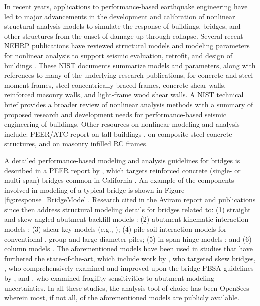 In recent years, applications to performance-based earthquake engineering have led to major advancements in the development and calibration of nonlinear structural analysis models to simulate the response of buildings, bridges, and other structures from the onset of damage up through collapse. Several recent NEHRP publications have reviewed structural models and modeling parameters for nonlinear analysis to support seismic evaluation, retrofit, and design of buildings \citep{nist2017guidelines, nist2017guidelinesa, nist2017guidelinesb}. These NIST documents summarize models and parameters, along with references to many of the underlying research publications, for concrete and steel moment frames, steel concentrically braced frames, concrete shear walls, reinforced masonry walls, and light-frame wood shear walls. A NIST technical brief \citep{deierlein2010nonlinear} provides a broader review of nonlinear analysis methods with a summary of proposed research and development needs for performance-based seismic engineering of buildings. Other resources on nonlinear modeling and analysis include: PEER/ATC report on tall buildings \citep{malley2010modeling}, \citet{spacone2004nonlinear} on composite steel-concrete structures, and \citet{nurbaiah2017modelling} on masonry infilled RC frames.

A detailed performance-based modeling and analysis guidelines for bridges is described in a PEER report by \citet{aviram2008guidelines}, which targets reinforced concrete (single- or multi-span) bridges common in California \citep{nbi2016national}. An example of the components involved in modeling of a typical bridge is shown in Figure \ref{fig:response_BridgeModel}. Research cited in the Aviram report and publications since then address structural modeling details for bridges related to: (1) straight and skew angled abutment backfill models \citep{shamsabadi2010validated}: (2) abutment kinematic interaction models \citep{zhang2002kinematic}: (3) shear key models (e.g., \cite{silva2009seismic}); (4) pile-soil interaction models for conventional \citep{hutchinson2001inelastic, taciroglu2006robust}, group \citep{lemnitzer2010nonlinear} and large-diameter \citep{khalili-tehrani2014nonlinear} piles; (5) in-span hinge models \citep{hube2008experimental}; and (6) column models \citep{terzic2015concrete, xu2011hysteretic}. The aforementioned models have been used in studies that have furthered the state-of-the-art, which include work by \citet{kaviani2014performancebased}, who targeted skew bridges, \citet{omrani2015guidelines}, who comprehensively examined and improved upon the bridge PBSA guidelines by \citet{aviram2008guidelines}, and \citet{omrani2017variability}, who examined fragility sensitivities to abutment modeling uncertainties. In all these studies, the analysis tool of choice has been OpenSees \citep{mckenna2011opensees} wherein most, if not all, of the aforementioned models are publicly available. 

